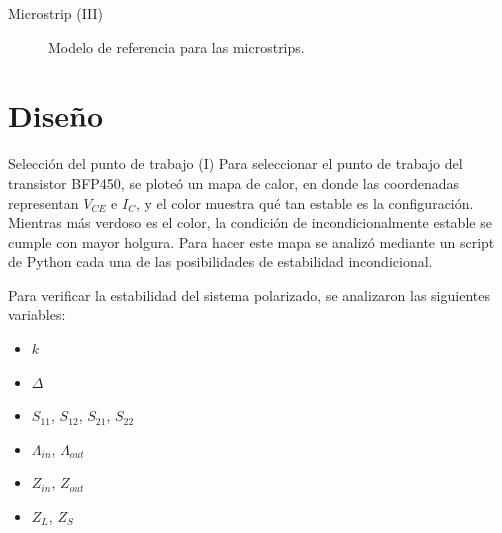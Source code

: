 \documentclass[9pt]{beamer}
\begin{document}
\begin{frame}{Microstrip (III)}
\begin{center}
\begin{figure}
			\caption{Modelo de referencia para las microstrips.}
		\end{figure}
		\end{center}
		
	\end{frame}
	
	\section{Diseño}
	
	\begin{frame}{Selección del punto de trabajo (I)}
		Para seleccionar el punto de trabajo del transistor BFP450, se ploteó un mapa de calor, en donde las coordenadas representan $V_{CE}$ e $I_C$, y el color muestra qué tan estable es la configuración. Mientras más verdoso es el color, la condición de incondicionalmente estable se cumple con mayor holgura. Para hacer este mapa se analizó mediante un script de Python cada una de las posibilidades de estabilidad incondicional. 
		
		Para verificar la estabilidad del sistema polarizado, se analizaron las siguientes variables:
		
		\begin{itemize}
			\item $k$
			\item $\Delta$
			\item $S_{11}$, $S_{12}$, $S_{21}$, $S_{22}$
			\item $\Lambda_{in}$, $\Lambda_{out}$
			\item $Z_{in}$, $Z_{out}$
			\item $Z_L$, $Z_S$
		\end{itemize}
	\end{frame}
	
\end{document}
